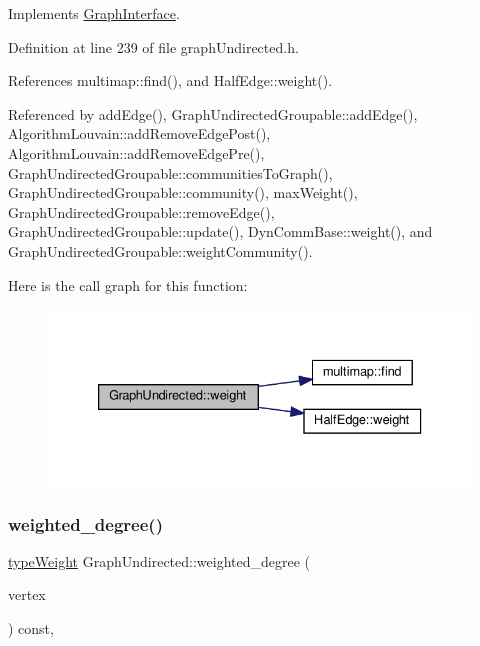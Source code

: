 Implements \hyperlink{classGraphInterface_a27f350094f566bb4840f22c5bc0695c4}{Graph\+Interface}.



Definition at line 239 of file graph\+Undirected.\+h.



References multimap\+::find(), and Half\+Edge\+::weight().



Referenced by add\+Edge(), Graph\+Undirected\+Groupable\+::add\+Edge(), Algorithm\+Louvain\+::add\+Remove\+Edge\+Post(), Algorithm\+Louvain\+::add\+Remove\+Edge\+Pre(), Graph\+Undirected\+Groupable\+::communities\+To\+Graph(), Graph\+Undirected\+Groupable\+::community(), max\+Weight(), Graph\+Undirected\+Groupable\+::remove\+Edge(), Graph\+Undirected\+Groupable\+::update(), Dyn\+Comm\+Base\+::weight(), and Graph\+Undirected\+Groupable\+::weight\+Community().

Here is the call graph for this function\+:\nopagebreak
\begin{figure}[H]
\begin{center}
\leavevmode
\includegraphics[width=333pt]{classGraphUndirected_ae40d431c92d8b4884c7915c44d42f356_cgraph}
\end{center}
\end{figure}
\mbox{\label{classGraphUndirected_ad2b1cd9a6dded42bd5431134aba26612}} 
\subsubsection{\texorpdfstring{weighted\+\_\+degree()}{weighted\_degree()}}
{\footnotesize\ttfamily \hyperlink{edge_8h_a2e7ea3be891ac8b52f749ec73fee6dd2}{type\+Weight} Graph\+Undirected\+::weighted\+\_\+degree (\begin{DoxyParamCaption}\item[{const \hyperlink{edge_8h_a5fbd20c46956d479cb10afc9855223f6}{type\+Vertex} \&}]{vertex }\end{DoxyParamCaption}) const\hspace{0.3cm}{\ttfamily [inline]}, {\ttfamily [virtual]}}


